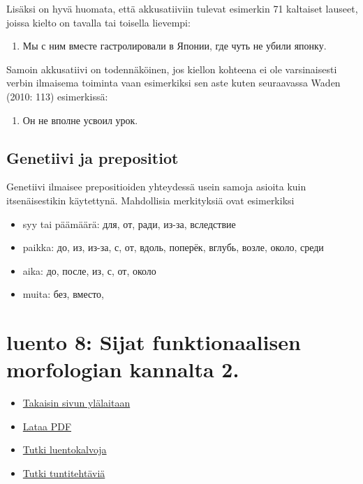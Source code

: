 \documentclass[]{scrartcl}
\providecommand{\tightlist}{%
  \setlength{\itemsep}{0pt}\setlength{\parskip}{0pt}}
\begin{document}
Lisäksi on hyvä huomata, että akkusatiiviin tulevat esimerkin 71
kaltaiset lauseet, joissa kielto on tavalla tai toisella lievempi:

\begin{enumerate}
\def\labelenumi{(\arabic{enumi})}
\setcounter{enumi}{70}
\tightlist
\item
  Мы с ним вместе гастролировали в Японии, где чуть не убили японку.
\end{enumerate}

Samoin akkusatiivi on todennäköinen, jos kiellon kohteena ei ole
varsinaisesti verbin ilmaisema toiminta vaan esimerkiksi sen aste kuten
seuraavassa Waden (2010: 113) esimerkissä:

\begin{enumerate}
\def\labelenumi{(\arabic{enumi})}
\setcounter{enumi}{71}
\tightlist
\item
  Он не вполне усвоил урок.
\end{enumerate}

\subsection{Genetiivi ja prepositiot}\label{genetiivi-ja-prepositiot}

Genetiivi ilmaisee prepositioiden yhteydessä usein samoja asioita kuin
itsenäisestikin käytettynä. Mahdollisia merkityksiä ovat esimerkiksi

\begin{itemize}
\tightlist
\item
  syy tai päämäärä: для, от, ради, из-за, вследствие
\item
  paikka: до, из, из-за, с, от, вдоль, поперёк, вглубь, возле, около,
  среди
\item
  aika: до, после, из, с, от, около
\item
  muita: без, вместо,
\end{itemize}

\section{luento 8: Sijat funktionaalisen morfologian kannalta
2.}\label{luento-8-sijat-funktionaalisen-morfologian-kannalta-2.}

\begin{itemize}
\tightlist
\item
  \href{https://mustikka.uta.fi/~juho_harme/morfologia/\#tästä-kurssista}{Takaisin
  sivun ylälaitaan}
\item
  \href{http://mustikka.uta.fi/~juho_harme/morfologia/materiaalit/luento8.pdf}{Lataa
  PDF}
\item
  \href{http://mustikka.uta.fi/~juho_harme/morfologia/presentations/luento8.html}{Tutki
  luentokalvoja}
\item
  \href{http://mustikka.uta.fi/~juho_harme/morfologia/tehtavat/luento8.pdf}{Tutki
  tuntitehtäviä}
\end{itemize}
\end{document}
